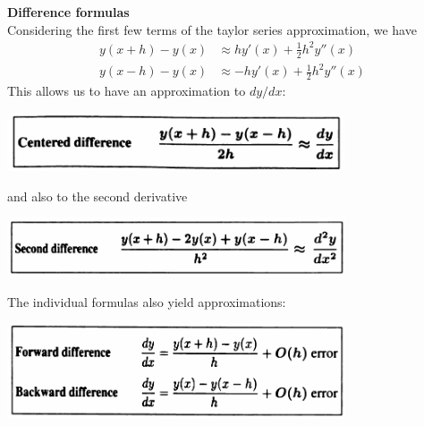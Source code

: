 \documentclass{report}
\begin{document}
\textbf{Difference formulas}\\
Considering the first few terms of the taylor series approximation, we have
\begin{align*}
y(x+h)-y(x)&\approx hy'(x)+\frac{1}{2}h^2y''(x)\\
y(x-h)-y(x)&\approx-hy'(x)+\frac{1}{2}h^2y''(x)
\end{align*}
This allows us to have an approximation to $dy/dx$:
\begin{center}
\includegraphics[width=10cm]{22}
\end{center}
and also to the second derivative
\begin{center}
\includegraphics[width=10cm]{23}
\end{center}
The individual formulas also yield approximations:
\begin{center}
\includegraphics[width=10cm]{24}
\end{center}
\newpage
\end{document}
